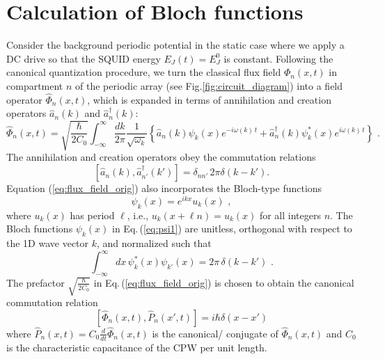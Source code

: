 \chapter{Calculation of Bloch functions}\label{ch:appendix_bloch}
%
\noindent
Consider the background periodic potential in the static case where we apply a DC drive so that the SQUID energy $E_J(t) = E_J^0$ is constant. Following the canonical quantization procedure, we turn the classical flux field ${\Phi}_n(x,t)$ 
in compartment $n$ of the periodic array (see Fig.\ref{fig:circuit_diagram})
into a field operator $\hat{\Phi}_n(x,t)$, which is expanded in terms of 
annihilation and creation operators $ \hat{a}_n(k)$ and ${\hat a}_n^\dagger(k)$:
%
\begin{equation} \label{eq:flux_field_orig}
    \hat{\Phi}_n(x,t) = \sqrt{\frac{\hbar}{2 C_0}} 
    \int_{-\infty}^{\infty}\frac{dk}{2 \pi} \frac{1}{\sqrt{\omega_k}}
    \left\{ \hat{a}_n(k) \psi_k(x)e^{-i \omega(k) \, t} + 
    \hat{a}_n^{\dagger}(k) \psi_k^*(x) e^{i \omega(k) \, t} \right\} \, \, .
\end{equation}
%
The annihilation and creation operators obey the commutation relations
%
\begin{equation} \label{eq:cra_orig}
    \left[ \hat{a}_n(k),{\hat a}_{n'}^\dagger(k') \right] = \delta_{nn'} \, 2 \pi \delta(k - k').
\end{equation}
%
Equation (\ref{eq:flux_field_orig}) also incorporates the Bloch-type functions 
%
\begin{equation} \label{eq:psi1}
\psi_k(x) = e^{i k x} u_k(x) \, \, ,   
\end{equation}
%
where $u_k(x)$ has period $\ell$, i.e., $u_k(x + \ell n) = u_k(x)$ for all integers $n$.
The Bloch functions $\psi_k(x)$ in Eq.\,(\ref{eq:psi1}) are unitless, orthogonal with respect to 
the 1D wave vector $k$, and normalized such that
%
\begin{equation} \label{eq:psi1_norm_orig}
\int_{-\infty}^{\infty} dx \, \psi^*_k(x) \psi_{k'}(x) = 2 \pi \, \delta(k - k') \, \, .
\end{equation}
%
The prefactor $\displaystyle{\sqrt{\frac{\hbar}{2 C_0}}}$ in Eq.\,(\ref{eq:flux_field_orig}) is chosen 
to obtain the canonical commutation relation 
%
\begin{equation} \label{eq:commrelphi}
\left[ \hat{\Phi}_n(x,t), \hat{P}_n(x',t) \right] = i \hbar \delta(x-x')
\end{equation}
%
where $\hat{P}_n(x,t) = C_0 \displaystyle{\frac{d}{dt}} \hat{\Phi}_n(x,t)$ is the 
canonical/ conjugate of $\hat{\Phi}_n(x,t)$ and $C_0$ is the characteristic capacitance of the CPW per unit length. 
